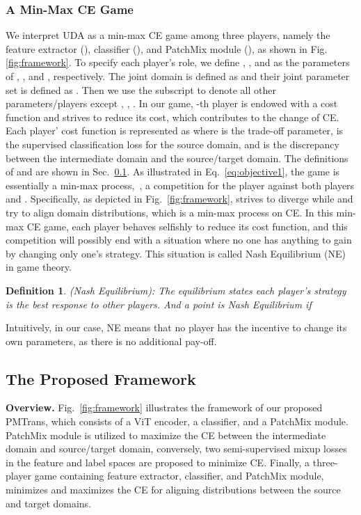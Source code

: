 \documentclass[10pt,twocolumn,letterpaper, ]{article}
\newtheorem{definition}{Definition}
\begin{document}
\subsubsection{A Min-Max CE Game}
We interpret UDA as a min-max CE game among three players, namely the feature extractor (), classifier (), and PatchMix module (), as shown in Fig. \ref{fig:framework}. 
To specify each player's role, we define , , and  as the parameters of , , and , respectively. The joint domain is defined as  and their joint parameter set is defined as . 
Then we use the subscript  to denote all other parameters/players except , \eg, . In our game, -th player is endowed with a cost function  and strives to reduce its cost, which contributes to the change of CE. Each player' cost function  is represented as
{\setlength\abovedisplayskip{2pt}
\setlength\belowdisplayskip{2pt}
}
where  is the trade-off parameter,  is the supervised classification loss for the source domain, and  is the discrepancy between the intermediate domain and the source/target domain. The definitions of  and  are shown in Sec.~\ref{PMTransframework}. As illustrated in Eq.~\ref{eq:objective1}, the game is essentially a min-max process,~\ie, a competition for the player  against both players  and . Specifically, as depicted in Fig.~\ref{fig:framework},  strives to diverge while  and  try to align domain distributions, which is a min-max process on CE. In this min-max CE game, each player behaves selfishly to reduce its cost function, and this competition will possibly end with a situation where no one has anything to gain by changing only one's strategy. This situation is called Nash Equilibrium (NE) in game theory. 



\begin{definition}
\label{Def:NE}
(Nash Equilibrium): The equilibrium states each player's strategy is the best response to other players. And a point  is Nash Equilibrium if 
\begin{small}

\end{small}
\end{definition}
Intuitively, in our case, NE means that no player has the incentive to change its own parameters, as there is no additional pay-off.








\subsection{The Proposed Framework}
\label{PMTransframework}
\noindent \textbf{Overview.}
Fig.~\ref{fig:framework} illustrates the framework of our proposed PMTrans, which consists of a ViT encoder, a classifier, and a PatchMix module. PatchMix module is utilized to maximize the CE between the intermediate domain and source/target domain, conversely, two semi-supervised mixup losses in the feature and label spaces are proposed to minimize CE. Finally, a three-player game containing feature extractor, classifier, and PatchMix module, minimizes and maximizes the CE for aligning distributions between the source and target domains.  
\end{document}
